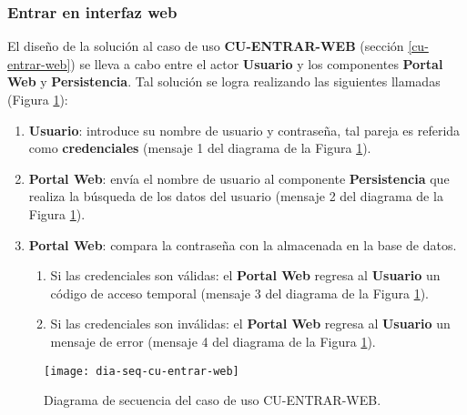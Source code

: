 \subsubsection{Entrar en interfaz web}
El diseño de la solución al caso de uso \textbf{CU-ENTRAR-WEB} (sección \ref{cu-entrar-web}) se lleva a cabo entre el actor \textbf{Usuario} y los componentes \textbf{Portal Web} y \textbf{Persistencia}. Tal solución se logra realizando las siguientes llamadas (Figura \ref{fig:dia-seq-cu-entrar-web}):
\begin{enumerate}
	\item \textbf{Usuario}: introduce su nombre de usuario y contraseña, tal pareja es referida como \textbf{credenciales} (mensaje 1 del diagrama de la Figura \ref{fig:dia-seq-cu-entrar-web}).
	\item \textbf{Portal Web}: envía el nombre de usuario al componente \textbf{Persistencia} que realiza la búsqueda de los datos del usuario (mensaje 2 del diagrama de la Figura \ref{fig:dia-seq-cu-entrar-web}).
	\item \textbf{Portal Web}: compara la contraseña con la almacenada en la base de datos.
	\begin{enumerate}
		\item Si las credenciales son válidas: el \textbf{Portal Web} regresa al \textbf{Usuario} un código de acceso temporal (mensaje 3 del diagrama de la Figura \ref{fig:dia-seq-cu-entrar-web}).
		\item Si las credenciales son inválidas: el \textbf{Portal Web} regresa al \textbf{Usuario} un mensaje de error (mensaje 4 del diagrama de la Figura \ref{fig:dia-seq-cu-entrar-web}).
	\end{enumerate}
\end{enumerate}
\begin{figure}[h]
	\centering
	\texttt{[image: dia-seq-cu-entrar-web]}
	\caption{Diagrama de secuencia del caso de uso CU-ENTRAR-WEB.}
	\label{fig:dia-seq-cu-entrar-web}
\end{figure}
